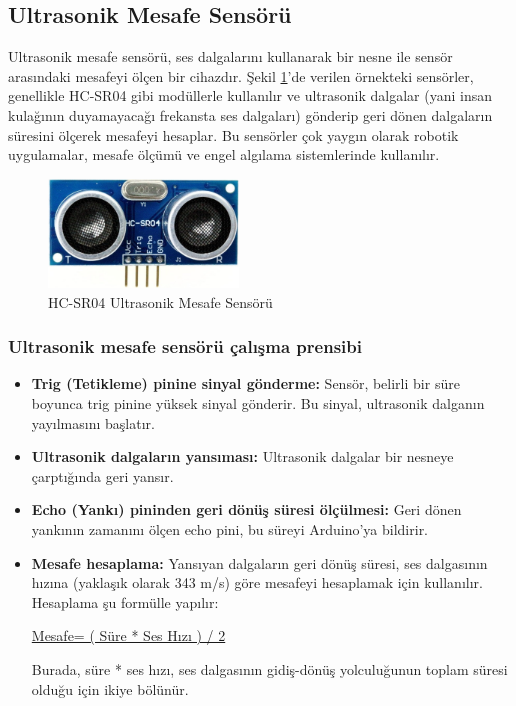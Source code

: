\subsection{Ultrasonik Mesafe Sensörü}
    Ultrasonik mesafe sensörü, ses dalgalarını kullanarak bir nesne ile sensör arasındaki mesafeyi ölçen bir cihazdır. Şekil \ref{fig:17}'de verilen örnekteki sensörler, genellikle HC-SR04 gibi modüllerle kullanılır ve ultrasonik dalgalar (yani insan kulağının duyamayacağı frekansta ses dalgaları) gönderip geri dönen dalgaların süresini ölçerek mesafeyi hesaplar. Bu sensörler çok yaygın olarak robotik uygulamalar, mesafe ölçümü ve engel algılama sistemlerinde kullanılır.

\begin{figure}[H]
\centering
\includegraphics[width=0.45\textwidth]{Resimler/17.png}
\caption{HC-SR04 Ultrasonik Mesafe Sensörü}
\label{fig:17}
\end{figure}

\subsubsection{Ultrasonik mesafe sensörü çalışma prensibi}

\begin{itemize}
\item \textbf{Trig (Tetikleme) pinine sinyal gönderme:} Sensör, belirli bir süre boyunca trig pinine yüksek sinyal gönderir. Bu sinyal, ultrasonik dalganın yayılmasını başlatır.
\item \textbf{Ultrasonik dalgaların yansıması:} Ultrasonik dalgalar bir nesneye çarptığında geri yansır.
\item \textbf{Echo (Yankı) pininden geri dönüş süresi ölçülmesi:} Geri dönen yankının zamanını ölçen echo pini, bu süreyi Arduino'ya bildirir.
\item \textbf{Mesafe hesaplama:} Yansıyan dalgaların geri dönüş süresi, ses dalgasının hızına (yaklaşık olarak 343 m/s) göre mesafeyi hesaplamak için kullanılır. Hesaplama şu formülle yapılır:

\par\underline{Mesafe= ( Süre * Ses Hızı ) / 2}
\centering
\par Burada, süre * ses hızı, ses dalgasının gidiş-dönüş yolculuğunun toplam süresi olduğu için ikiye bölünür.
\end{itemize}

